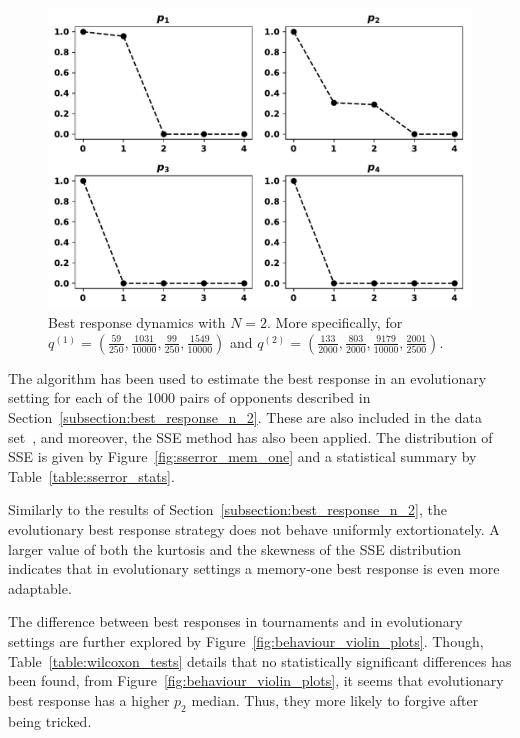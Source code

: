 \documentclass[10pt]{article}
\begin{document}
\begin{figure}[!htbp]
    \centering
    \includegraphics[width=.6\textwidth]{img/evolution_example_two.pdf}
    \caption{Best response dynamics with \(N=2\). More specifically, for
    \(q ^{(1)}=(\frac{59}{250},
                \frac{1031}{10000},
                \frac{99}{250},
                \frac{1549}{10000})\) and
    \(q ^{(2)}=(\frac{133}{2000},
                \frac{803}{2000},
                \frac{9179}{10000},
                \frac{2001}{2500})\).}
\label{fig:best_response_dynamics_results}
\end{figure}

The algorithm has been used to estimate the best response in an evolutionary
setting for each of the 1000 pairs of opponents described in
Section~\ref{subsection:best_response_n_2}. These are also included in the data
set~\cite{glynatsi2019}, and moreover, the SSE method has also been applied. The
distribution of SSE is given by Figure~\ref{fig:sserror_mem_one} and a
statistical summary by Table~\ref{table:sserror_stats}.

Similarly to the results of Section~\ref{subsection:best_response_n_2}, the
evolutionary best response strategy does not behave uniformly extortionately. A
larger value of both the kurtosis and the skewness of the SSE distribution
indicates that in evolutionary settings a memory-one best response is even more
adaptable.

The difference between best responses in tournaments and in evolutionary
settings are further explored by Figure~\ref{fig:behaviour_violin_plots}.
Though, Table~\ref{table:wilcoxon_tests} details that no statistically
significant differences has been found, from
Figure~\ref{fig:behaviour_violin_plots}, it seems that evolutionary best
response has a higher $p_2$ median. Thus, they more likely to forgive after
being tricked.
\end{document}
